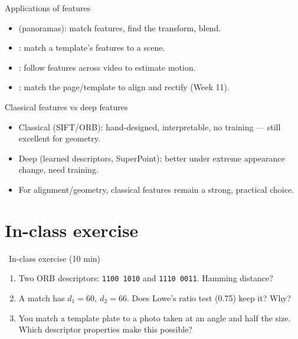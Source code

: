 \documentclass[10pt,aspectratio=169]{beamer}
\begin{document}
\begin{frame}{Applications of features}
  \begin{itemize}
    \item {} (panoramas): match features, find the transform, blend.
    \item {}: match a template's features to a scene.
    \item {}: follow features across video to estimate motion.
    \item {}: match the page/template to align and rectify (Week 11).
  \end{itemize}
\end{frame}

\begin{frame}{Classical features vs deep features}
  \begin{itemize}
    \item Classical (SIFT/ORB): hand-designed, interpretable, no training — still excellent for geometry.
    \item Deep (learned descriptors, SuperPoint): better under extreme appearance change, need training.
    \item For alignment/geometry, classical features remain a strong, practical choice.
  \end{itemize}
\end{frame}

\section{In-class exercise}

\begin{frame}{\faPen~In-class exercise (10 min)}
  \begin{infobox}
  \end{infobox}
  \begin{enumerate}
    \item Two ORB descriptors: \texttt{1100\,1010} and \texttt{1110\,0011}. Hamming distance?
    \item A match has $d_1=60,\ d_2=66$. Does Lowe's ratio test (0.75) keep it? Why?
    \item You match a template plate to a photo taken at an angle and half the size. Which
          descriptor properties make this possible?
  \end{enumerate}
\end{frame}
\end{document}

